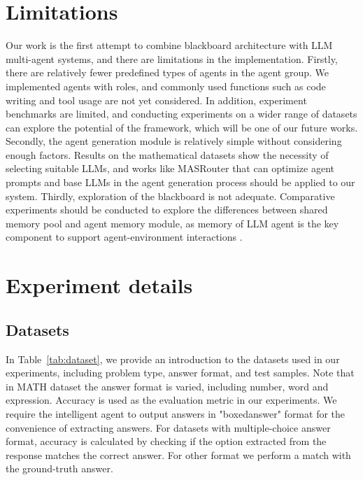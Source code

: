 \documentclass[11pt]{article}
\begin{document}
\section*{Limitations}

Our work is the first attempt to combine blackboard architecture with LLM multi-agent systems, and there are limitations in the implementation. Firstly, there are relatively fewer predefined types of agents in the agent group. We implemented agents with roles, and commonly used functions such as code writing and tool usage are not yet considered. In addition, experiment benchmarks are limited, and conducting experiments on a wider range of datasets can explore the potential of the framework, which will be one of our future works. 
Secondly, the agent generation module is relatively simple without considering enough factors. Results on the mathematical datasets show the necessity of selecting suitable LLMs, and works like MASRouter \citep{yue2025masrouterlearningroutellms} that can optimize agent prompts and base LLMs in the agent generation process should be applied to our system.  
Thirdly, exploration of the blackboard is not adequate. Comparative experiments should be conducted to explore the differences between shared memory pool and agent memory module, as memory of LLM agent is the key component to support agent-environment interactions \citep{zhang2024surveymemorymechanismlarge}.



%

\appendix

\section{Experiment details}
\subsection{Datasets}
In Table~\ref{tab:dataset}, we provide an introduction to the datasets used in our experiments, including problem type, answer format, and test samples. Note that in MATH dataset the answer format is varied, including number, word and expression. Accuracy is used as the evaluation metric in our experiments. We require the intelligent agent to output answers in "boxed{answer}" format for the convenience of extracting answers. For datasets with multiple-choice answer format, accuracy is calculated by checking if the option extracted from the response matches the correct answer. For other format we perform a match with the ground-truth answer.
\end{document}
